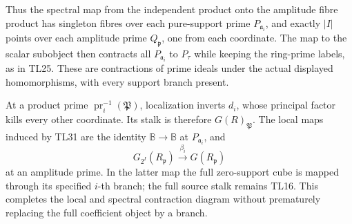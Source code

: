 Thus the spectral map from the independent product onto the amplitude
fibre product has singleton fibres over each pure-support prime
\(P_{\mathfrak a_i}\), and exactly \(|I|\) points over each amplitude
prime \(Q_{\mathfrak p}\), one from each coordinate. The map to the
scalar subobject then contracts all \(P_{\mathfrak a_i}\) to \(P_\tau\)
while keeping the ring-prime labels, as in TL25. These are contractions
of prime ideals under the actual displayed homomorphisms, with every
support branch present.

At a product prime \(\operatorname{pr}_i^{-1}(\mathfrak P)\),
localization inverts \(d_i\), whose principal factor kills every other
coordinate. Its stalk is therefore \(G(R)_{\mathfrak P}\). The local
maps induced by TL31 are the identity \(\mathbb B\to\mathbb B\) at
\(P_{\mathfrak a_i}\), and \[
 G_{2^I}(R_{\mathfrak p})\xrightarrow{\beta_i}G(R_{\mathfrak p})
 \tag{TL32}
\] at an amplitude prime. In the latter map the full zero-support cube
is mapped through its specified \(i\)-th branch; the full source stalk
remains TL16. This completes the local and spectral contraction diagram
without prematurely replacing the full coefficient object by a branch.
